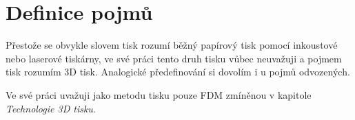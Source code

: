 \section{Definice pojmů}\label{3d-tisk-definice-pojmu}

Přestože se obvykle slovem tisk rozumí běžný papírový tisk pomocí inkoustové nebo laserové tiskárny,
ve své práci tento druh tisku vůbec neuvažuji a pojmem tisk rozumím 3D tisk.
Analogické předefinování si dovolím i u pojmů odvozených.

Ve své práci uvažuji jako metodu tisku pouze FDM zmíněnou v kapitole \textit{Technologie 3D tisku}.
